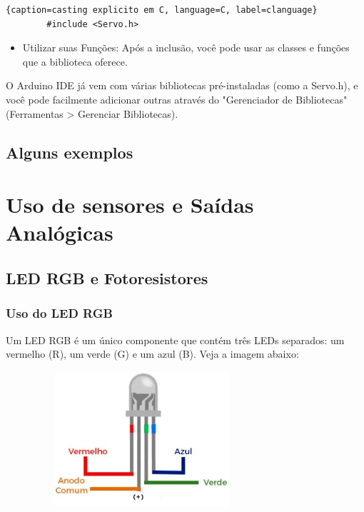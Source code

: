 \documentclass{report}
\begin{document}
	\begin{center}
		
		\begin{lstlisting}{caption=casting explicito em C, language=C, label=clanguage}
		#include <Servo.h>	

		\end{lstlisting}
	\end{center}
	
	
	\begin{itemize}
		\item Utilizar suas Funções: Após a inclusão, você pode usar as classes e funções que a biblioteca oferece.
		
		
	\end{itemize}
	
	O Arduino IDE já vem com várias bibliotecas pré-instaladas (como a Servo.h), e você pode facilmente adicionar outras através do "Gerenciador de Bibliotecas" (Ferramentas > Gerenciar Bibliotecas).
	
	
	
	
	\subsection{Alguns exemplos}
	
	\section{Uso de sensores e Saídas Analógicas}
	\subsection{LED RGB e Fotoresistores}
	\subsubsection{Uso do LED RGB}
	Um LED RGB é um único componente que contém três LEDs separados: um vermelho (R), um verde (G) e um azul (B). Veja a imagem abaixo:
	
	\begin{figure}[ht]
		\centering
		\includegraphics[width=8cm,height=5cm,keepaspectratio=false]{imagens/led_rgb.png}
		
		
	\end{figure}
	
\end{document}
